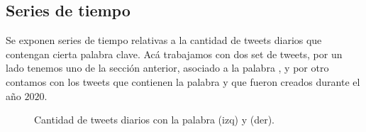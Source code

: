 \documentclass{article}
\begin{document}
\subsection{Series de tiempo}
Se exponen series de tiempo relativas a la cantidad de tweets diarios que contengan cierta palabra clave. Acá trabajamos con dos set de tweets, por un lado tenemos uno de la sección anterior, asociado a la palabra , y por otro contamos con los tweets que contienen la palabra  y que fueron creados durante el año $2020$.
\begin{figure}[H]
	\centering
	\caption{Cantidad de tweets diarios con la palabra  (izq) y  (der).}
\end{figure}
\end{document}
